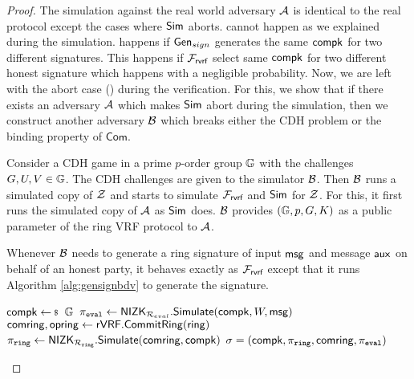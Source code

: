 \begin{proof}
	The  simulation against the real world adversary $ \mathcal{A} $ is identical to the real protocol except the cases where $ \mathsf{Sim} $ aborts.  cannot happen as we explained during the simulation.   happens if $ \mathsf{Gen}_{sign} $ generates the same $ \mathsf{compk} $ for two different signatures. This happens if $ \mathcal{F}_{\textsf{rvrf}} $  select same $ \mathsf{compk} $ for two different honest signature which happens with a negligible probability.
	Now, we are left with the abort case () during the verification.
	For this, we show that if there exists an adversary $ \mathcal{A} $ which makes $ \mathsf{Sim} $ abort during the simulation, then we construct another adversary $ \mathcal{B} $ which breaks either the CDH problem or the binding property of $ \mathsf{Com}$.
	
	Consider a CDH game in a prime $ p $-order group  $ {\mathbb{G}} $ with the challenges $ G,U, V \in {\mathbb{G}}$. The CDH challenges are given to the simulator $ \mathcal{B} $. Then $ \mathcal{B} $ runs a simulated copy of $ \mathcal{Z} $ and starts to simulate $ \mathcal{F}_{\textsf{rvrf}} $ and $ \mathsf{Sim} $ for $ \mathcal{Z} $. For this, it first runs the simulated copy of $ \mathcal{A} $ as $ \mathsf{Sim} $ does. $ \mathcal{B} $ provides $ ({\mathbb{G}}, p, G , K) $ as a public parameter of the ring VRF protocol to $ \mathcal{A} $.
	
	Whenever $ \mathcal{B} $ needs to generate a ring signature of input $ \mathsf{msg} $ and message $ \mathsf{aux} $ on behalf of an honest party, it behaves exactly as $ \mathcal{F}_{\textsf{rvrf}} $ except that it runs   Algorithm \ref{alg:gensignbdv} to generate the signature. 
	
	\begin{algorithm}
		\caption{$\gen_{sign}(\ring,W,\pk,\aux,\msg)$}
		\label{alg:gensignbdv}	 	
		\begin{algorithmic}[1]
			\State $ \compk\leftsample \grE$
			\State $ \pi_{\mathtt{eval}} \leftarrow {\ensuremath{\mathsf{NIZK}}}_{\mathcal{R}_{eval}}.{\mathsf{Simulate}}(\mathsf{compk}, W,\mathsf{msg}) $
			\State $ \mathsf{comring}, \mathsf{opring} \leftarrow {\ensuremath{\mathsf{rVRF}}}.{\mathsf{CommitRing}}(\mathsf{ring}) $
			\State $ \pi_{\mathtt{ring}} \leftarrow {\ensuremath{\mathsf{NIZK}}}_{\mathcal{R}_{\mathtt{ring}}}.{\mathsf{Simulate}}(\mathsf{comring}, \mathsf{compk}) $ 
			\State\Return$ \sigma = (\mathsf{compk},\pi_{\mathtt{ring}}, \mathsf{comring}, \pi_{\mathtt{eval}}) $
		\end{algorithmic}
		

\end{algorithm}
\end{proof}

